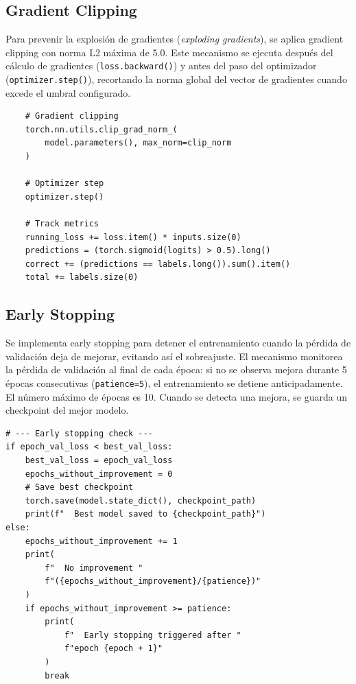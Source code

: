 \subsection{Gradient Clipping}

Para prevenir la explosión de gradientes (\textit{exploding gradients}), se aplica gradient
clipping con norma L2 máxima de 5.0. Este mecanismo se ejecuta después del cálculo de
gradientes (\texttt{loss.backward()}) y antes del paso del optimizador
(\texttt{optimizer.step()}), recortando la norma global del vector de gradientes cuando
excede el umbral configurado.

\begin{verbatim}
    # Gradient clipping
    torch.nn.utils.clip_grad_norm_(
        model.parameters(), max_norm=clip_norm
    )

    # Optimizer step
    optimizer.step()

    # Track metrics
    running_loss += loss.item() * inputs.size(0)
    predictions = (torch.sigmoid(logits) > 0.5).long()
    correct += (predictions == labels.long()).sum().item()
    total += labels.size(0)
\end{verbatim}

\subsection{Early Stopping}

Se implementa early stopping para detener el entrenamiento cuando la pérdida de validación
deja de mejorar, evitando así el sobreajuste. El mecanismo monitorea la pérdida de
validación al final de cada época: si no se observa mejora durante 5 épocas consecutivas
(\texttt{patience=5}), el entrenamiento se detiene anticipadamente. El número máximo de
épocas es 10. Cuando se detecta una mejora, se guarda un checkpoint del mejor modelo.

\begin{verbatim}
# --- Early stopping check ---
if epoch_val_loss < best_val_loss:
    best_val_loss = epoch_val_loss
    epochs_without_improvement = 0
    # Save best checkpoint
    torch.save(model.state_dict(), checkpoint_path)
    print(f"  Best model saved to {checkpoint_path}")
else:
    epochs_without_improvement += 1
    print(
        f"  No improvement "
        f"({epochs_without_improvement}/{patience})"
    )
    if epochs_without_improvement >= patience:
        print(
            f"  Early stopping triggered after "
            f"epoch {epoch + 1}"
        )
        break
\end{verbatim}

